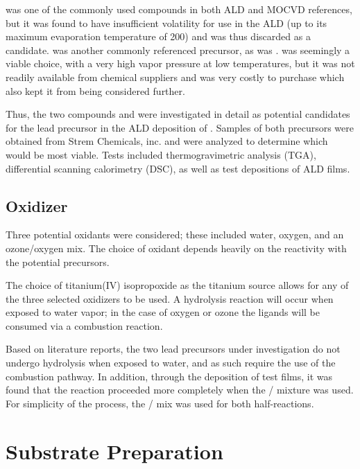  was one of the commonly used compounds in both ALD and MOCVD references, but it was found to have insufficient volatility for use in the ALD (up to its maximum evaporation temperature of 200\degC{}) and was thus discarded as a candidate. \TMHD{} was another commonly referenced precursor, as was \HFAc{}.  was seemingly a viable choice, with a very high vapor pressure at low temperatures, but it was not readily available from chemical suppliers and was very costly to purchase which also kept it from being considered further. 

Thus, the two compounds \HFAc{} and \TMHD{} were investigated in detail as potential candidates for the lead precursor in the ALD deposition of \PTO{}. Samples of both precursors were obtained from Strem Chemicals, inc. and were analyzed to determine which would be most viable. Tests included thermogravimetric analysis (TGA), differential scanning calorimetry (DSC), as well as test depositions of ALD films. 


\subsection{Oxidizer}

Three potential oxidants were considered; these included water, oxygen, and an ozone/oxygen mix. The choice of oxidant depends heavily on the reactivity with the potential precursors. 

The choice of titanium(IV) isopropoxide as the titanium source allows for any of the three selected oxidizers to be used. A hydrolysis reaction will occur when exposed to water vapor; in the case of oxygen or ozone the ligands will be consumed via a combustion reaction. 

Based on literature reports, the two lead precursors under investigation do not undergo hydrolysis when exposed to water, and as such require the use of the combustion pathway. In addition, through the deposition of test films, it was found that the reaction proceeded more completely when the / mixture was used. For simplicity of the process, the / mix was used for both half-reactions. 


\section{Substrate Preparation}
\label{sec:SampFab-Substrates}

